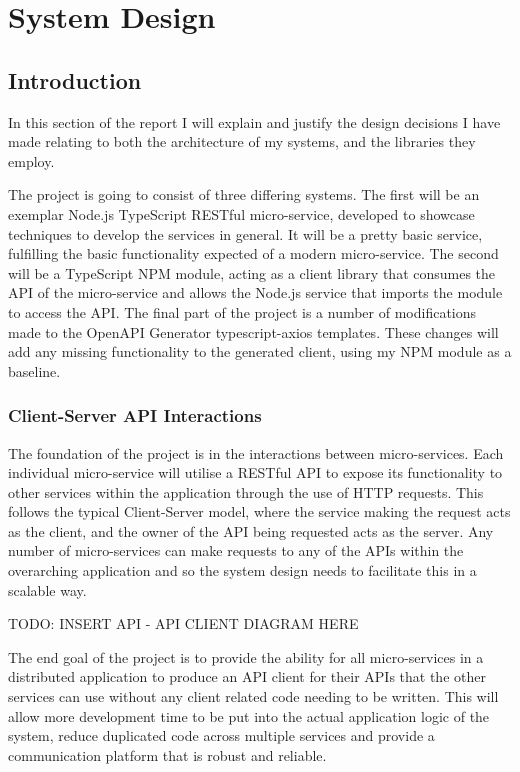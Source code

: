 \chapter{System Design}
\section{Introduction}

In this section of the report I will explain and justify the design decisions I have made relating to both the architecture of my systems, and the libraries they employ.

The project is going to consist of three differing systems. The first will be an exemplar Node.js TypeScript RESTful micro-service, developed to showcase techniques to develop the services in general.  It will be a pretty basic service, fulfilling the basic functionality expected of a modern micro-service. The second will be a TypeScript NPM module, acting as a client library that consumes the API of the micro-service and allows the Node.js service that imports the module to access the API. The final part of the project is a number of modifications made to the OpenAPI Generator typescript-axios templates. These changes will add any missing functionality to the generated client, using my NPM module as a baseline.

\subsection{Client-Server API Interactions}

The foundation of the project is in the interactions between micro-services. Each individual micro-service will utilise a RESTful API to expose its functionality to other services within the application through the use of HTTP requests. This follows the typical Client-Server model, where the service making the request acts as the client, and the owner of the API being requested acts as the server. Any number of micro-services can make requests to any of the APIs within the overarching application and so the system design needs to facilitate this in a scalable way.

TODO: INSERT API - API CLIENT DIAGRAM HERE

The end goal of the project is to provide the ability for all micro-services in a distributed application to produce an API client for their APIs that the other services can use without any client related code needing to be written. This will allow more development time to be put into the actual application logic of the system, reduce duplicated code across multiple services and provide a communication platform that is robust and reliable. 

